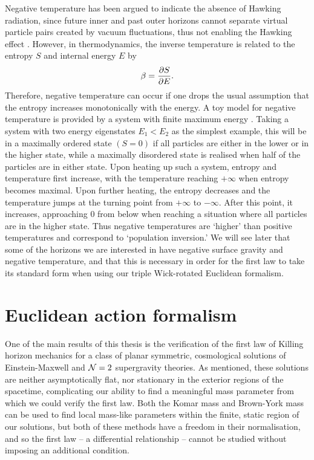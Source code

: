 Negative temperature has been argued to indicate the absence of Hawking radiation, since future inner and past outer horizons cannot separate virtual particle pairs created by vacuum fluctuations, thus not enabling the Hawking effect \cite{Binetruy:2014ela, Helou:2015zma}. However, in thermodynamics, the inverse temperature is related to the entropy $S$ and internal energy $E$ by
\begin{equation*}
    \beta = \frac{\partial S}{\partial E}.
\end{equation*} 
Therefore, negative temperature can occur if one drops the usual assumption that the entropy increases monotonically with the energy. A toy model for negative temperature is provided by a system with finite maximum energy \cite{Ramsey:1956}. Taking a system with two energy eigenstates $E_1< E_2$ as the simplest example, this will be in a maximally ordered state $(S=0)$ if all particles are either in the lower or in the higher state, while a maximally disordered state is realised when half of the particles are in either state. Upon heating up such a system, entropy and temperature first increase, with the temperature reaching $+\infty$  when entropy becomes maximal. Upon further heating, the entropy decreases and the temperature jumps at the turning point from $+\infty$ to $-\infty$. After this point, it increases, approaching $0$ from below when reaching a situation where all particles are in the higher state. Thus negative temperatures are `higher' than positive temperatures and correspond to `population inversion.' We will see later that some of the horizons we are interested in have negative surface gravity and negative temperature, and that this is necessary in order for the first law to take its standard form when using our triple Wick-rotated Euclidean formalism.

\section{Euclidean action formalism}
\label{sec:eucldeanactionformalism}
One of the main results of this thesis is the verification of the first law of Killing horizon mechanics for a class of planar symmetric, cosmological solutions of Einstein-Maxwell and ${\cal N} = 2$ supergravity theories. As mentioned, these solutions are neither asymptotically flat, nor stationary in the exterior regions of the spacetime, complicating our ability to find a meaningful mass parameter from which we could verify the first law. Both the Komar mass and Brown-York mass can be used to find local mass-like parameters within the finite, static region of our solutions, but both of these methods have a freedom in their normalisation, and so the first law -- a differential relationship -- cannot be studied without imposing an additional condition.

